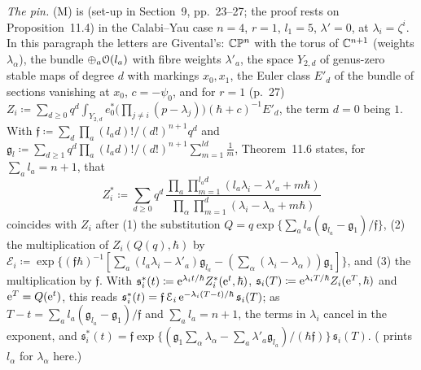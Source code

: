 \emph{The pin.} (M) is \cite[Theorem~11.6]{MR1408320} (set-up in Section~9, pp.~23--27; the proof rests on Proposition~11.4) in the Calabi--Yau case $n=4$, $r=1$, $l_1=5$, $\lambda'=0$, at $\lambda_i=\zeta^i$. In this paragraph the letters are Givental's: $\mathbb{C}\mathbb{P}^n$ with the torus of $\mathbb{C}^{n+1}$ (weights $\lambda_\alpha$), the bundle $\oplus_a\mathcal{O}(l_a)$ with fibre weights $\lambda'_a$, the space $Y_{2,d}$ of genus-zero stable maps of degree $d$ with markings $x_0,x_1$, the Euler class $E'_d$ of the bundle of sections vanishing at $x_0$, $c=-\psi_0$, and for $r=1$ (p.~27) $Z_i\coloneqq\sum_{d\geq0}q^d\int_{Y_{2,d}}e_0^*\bigl(\prod_{j\neq i}(p-\lambda_j)\bigr)(\hbar+c)^{-1}E'_d$, the term $d=0$ being $1$. With $\mathfrak f\coloneqq\sum_d\prod_a(l_ad)!/(d!)^{n+1}q^d$ and $\mathfrak g_l\coloneqq\sum_{d\geq1}q^d\prod_a(l_ad)!/(d!)^{n+1}\sum_{m=1}^{ld}\frac1m$, Theorem~11.6 states, for $\sum_al_a=n+1$, that
\[
Z_i^*\coloneqq\sum_{d\geq0}q^d\,\frac{\prod_a\prod_{m=1}^{l_ad}(l_a\lambda_i-\lambda'_a+m\hbar)}{\prod_\alpha\prod_{m=1}^d(\lambda_i-\lambda_\alpha+m\hbar)}
\]
coincides with $Z_i$ after (1) the substitution $Q=q\exp\{\sum_al_a(\mathfrak g_{l_a}-\mathfrak g_1)/\mathfrak f\}$, (2) the multiplication of $Z_i(Q(q),\hbar)$ by $\mathcal E_i\coloneqq\exp\{(\mathfrak f\hbar)^{-1}[\sum_a(l_a\lambda_i-\lambda'_a)\mathfrak g_{l_a}-(\sum_\alpha(\lambda_i-\lambda_\alpha))\mathfrak g_1]\}$, and (3) the multiplication by $\mathfrak f$. With $\mathfrak s_i^*(t)\coloneqq\mathrm{e}^{\lambda_it/\hbar}Z_i^*(\mathrm{e}^t,\hbar)$, $\mathfrak s_i(T)\coloneqq\mathrm{e}^{\lambda_iT/\hbar}Z_i(\mathrm{e}^T,\hbar)$ and $\mathrm{e}^T=Q(\mathrm{e}^t)$, this reads $\mathfrak s_i^*(t)=\mathfrak f\,\mathcal E_i\,\mathrm{e}^{-\lambda_i(T-t)/\hbar}\,\mathfrak s_i(T)$; as $T-t=\sum_al_a(\mathfrak g_{l_a}-\mathfrak g_1)/\mathfrak f$ and $\sum_al_a=n+1$, the terms in $\lambda_i$ cancel in the exponent, and $\mathfrak s_i^*(t)=\mathfrak f\exp\{(\mathfrak g_1\sum_\alpha\lambda_\alpha-\sum_a\lambda'_a\mathfrak g_{l_a})/(\hbar\mathfrak f)\}\,\mathfrak s_i(T)$. (\cite[Corollary~11.7]{MR1408320} prints $l_\alpha$ for $\lambda_\alpha$ here.)

